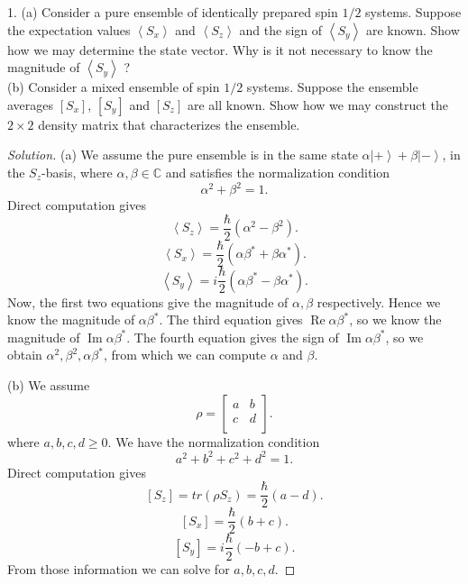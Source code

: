 
\begin{problem}
	1. (a) Consider a pure ensemble of identically prepared spin $1 / 2$ systems. Suppose the expectation values $\left\langle S_x\right\rangle$ and $\left\langle S_z\right\rangle$ and the sign of $\left\langle S_y\right\rangle$ are known. Show how we may determine the state vector. Why is it not necessary to know the magnitude of $\left\langle S_y\right\rangle$ ?\\
(b) Consider a mixed ensemble of spin $1 / 2$ systems. Suppose the ensemble averages $\left[S_x\right]$, $\left[S_y\right]$ and $\left[S_z\right]$ are all known. Show how we may construct the $2 \times 2$ density matrix that characterizes the ensemble.
\end{problem}
\begin{proof}[Solution]
	(a)
	We assume the pure ensemble is in the same state $\alpha \left| + \right\rangle + \beta \left| - \right\rangle $, in the $S_z$-basis, where $\alpha, \beta \in \mathbb{C}$ and satisfies the normalization condition
	\[
		\alpha^2 + \beta^2 = 1
	.\] 
	Direct computation gives
	\[
		\left\langle S_z \right\rangle  = \frac{\hbar}{2} \left( \alpha^2 - \beta^2 \right) 
	.\] 
	\[
		\left\langle S_x \right\rangle  = \frac{\hbar}{2} \left( \alpha \beta^* + \beta \alpha^* \right) 
	.\] 
\[
		\left\langle S_y \right\rangle  = i\frac{\hbar}{2} \left( \alpha \beta^* - \beta \alpha^* \right) 
	.\]
	Now, the first two equations give the magnitude of $\alpha, \beta$ respectively. Hence we know the magnitude of $\alpha \beta ^*$. The third equation gives $\operatorname{Re} \alpha \beta^*$, so we know the magnitude of $\operatorname{Im} \alpha \beta^*$. The fourth equation gives the sign of $\operatorname{Im} \alpha \beta^*$, so we obtain $\alpha^2, \beta^2, \alpha \beta^*$, from which we can compute $\alpha$ and $\beta$.


	(b) We assume 
	\[
		\rho = 
		\begin{bmatrix}
			a & b \\
			c & d \\
		\end{bmatrix}
	.\] 
	where $a, b, c, d \ge 0$.
	We have the normalization condition
	\[
		a^2 + b^2 + c^2 + d^2 = 1
	.\] 
	Direct computation gives
	\[
		[S_z] = tr(\rho S_z) = \frac{\hbar}{2} (a - d)
	.\] 
	\[
		[S_x] = \frac{\hbar}{2}(b + c)
	.\] 
	\[
		[S_y] = i\frac{\hbar}{2}(-b + c)
	.\]
	From those information we can solve for $a, b, c, d$.
\end{proof}





